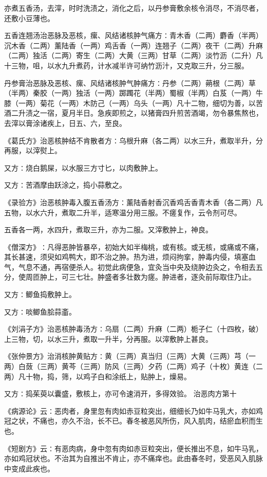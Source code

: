 \documentclass[a4paper,12pt,UTF8,twoside]{ctexbook}
\begin{document}
亦煮五香汤，去滓，时时洗渍之，消化之后，以丹参膏敷余核令消尽，不消尽者，还敷小豆薄也。

五香连翘汤治恶脉及恶核，瘰、风结诸核肿气痛方∶青木香（二两）麝香（半两）沉木香（二两）薰陆香（一两）鸡舌香（一两）连翘子（二两）夜干（二两）升麻（二两）独活（二两）寄生（二两）大黄（三两）甘草（二两）淡竹沥（二升）凡十三物，咀，以水九升煮药，计水减半许可纳竹沥汁，又克取三升，分三服。

丹参膏治恶脉及恶核、瘰、风结诸核肿气肿痛方∶丹参（二两）蒴根（二两）草（半两）秦胶（一两）独活（一两）踯躅花（半两）蜀椒（半两）白芨（一两）牛膝（一两）菊花（一两）木防己（一两）乌头（一两）凡十二物，细切为善，以苦酒二升渍之一宿，夏月半日。急疾即煎之，以猪膏四升煎苦酒竭，勿令暴焦熬也，去滓以膏涂诸疾上，日五、六，至良。

《葛氏方》治恶核肿结不肯散者方∶乌根升麻（各二两）以水三升，煮取半升，分再服，以滓熨上。

又方∶烧白鹅屎，以水服三方寸匕，以肉敷肿上。

又方∶苦酒摩由跃涂之，捣小蒜敷之。

《录验方》治恶核肿毒入腹五香汤方∶薰陆香射香沉香鸡舌香青木香（各二两）凡五物，以水六升，煮取二升半，适寒温分用三服。不瘥复作，云令剂可尽。

五香各一两，水四升，煮取三升，亦为二服。又滓敷肿上，神良。

《僧深方》∶凡得恶肿皆暴卒，初始大如半梅桃，或有核。或无核，或痛或不痛，其长甚速，须臾如鸡鸭大，即不治之肿。热为进，烦闷拘挛，肿毒内侵，填塞血气，气息不通，再宿便杀人。初觉此病便急，宜灸当中央及绕肿边灸之，令相去五分，使周匝肿上，可三七壮。肿盛者多壮数为瘥。肿进者，逐灸前际取住乃止。

又方∶鲫鱼捣敷肿上。

又方∶啖鲫鱼脍蒜齑。

《刘涓子方》治恶核肿毒汤方∶乌扇（二两）升麻（二两）栀子仁（十四枚，破）上三物，切，以水三升，煮取一升半，分再服。以滓敷肿上甚良。

《张仲景方》治消核肿黄贴方∶黄（三两）真当归（三两）大黄（三两）芎（一两）白蔹（三两）黄芩（三两）防风（三两）夕药（二两）鸡子（十枚）黄连（二两）凡十物，捣，筛，以鸡子白和涂纸上，贴肿上，燥易。

又方∶捣茱萸以囊盛，敷核上，亦可令速消开，多得效验。
治恶肉方第十

《病源论》云∶恶肉者，身里忽有肉如赤豆粒突出，细细长乃如牛马乳大，亦如鸡冠之状，不痛也，亦久不治，长不已。春冬被恶风所伤，风入肌肉，结瘀血积而生也。

《短剧方》云∶有恶肉病，身中忽有肉如赤豆粒突出，便长推出不息，如牛马乳，亦如鸡冠状也。不治其为自推出不肯止，亦不痛痒也。此由春冬时，受恶风入肌脉中变成此疾也。
\end{document}
